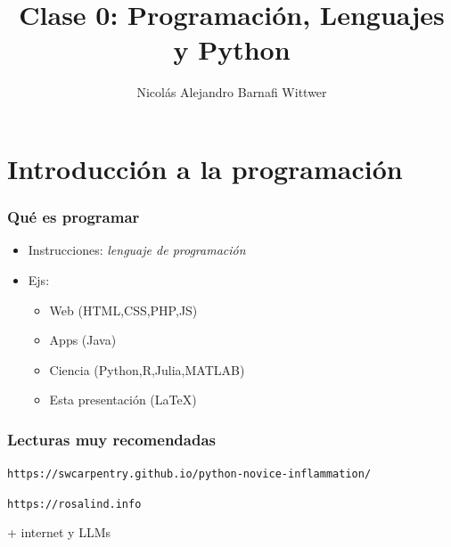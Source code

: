 \documentclass[14pt,aspectratio=169,xcolor=dvipsnames]{beamer}
\title[short title]{Clase 0: Programación, Lenguajes y Python}
\subtitle{}
\author[NA Barnafi] {Nicolás Alejandro Barnafi Wittwer}
\institute[UC|CMM] 
{
    Pontificia Universidad Católica de Chile \\
    Centro de Modelamiento Matemático
}
\date{}
\begin{document}
\begin{frame}
    \maketitle
\end{frame}
\section{Introducción a la programación}
\begin{frame}[t]\frametitle{Qué es programar}

\begin{itemize}
    \item Instrucciones: \emph{lenguaje de programación}
    \item Ejs: 
        \begin{itemize}
            \item Web (HTML,CSS,PHP,JS)
            \item Apps (Java)
            \item {Ciencia (Python,R,Julia,MATLAB)}
            \item Esta presentación (\LaTeX)
        \end{itemize}
\end{itemize}

\vspace{1cm}
\pause {}
\end{frame}
\begin{frame}\frametitle{Lecturas muy recomendadas}
\texttt{https://swcarpentry.github.io/python-novice-inflammation/}

\texttt{https://rosalind.info}

+ internet y LLMs
\end{frame}
\end{document}
